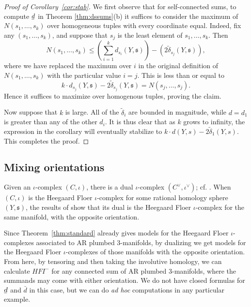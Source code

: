 \documentclass[11 pt]{amsart}
\theoremstyle{remark}
\def\s{\mathfrak s}
\newcommand{\bunderline}[1]{\underline{#1\mkern-2mu}\mkern2mu }
\def\du {\bar{d}}
\def\dl {\bunderline{d}}
\def\HFI {\mathit{HFI}}
\newcommand \HFIm {\HFI^-}
\def\inv{\iota}
\def\tdelta{\tilde\delta}
\begin{document}
\begin{proof}[Proof of Corollary~\ref{cor:stab}]
We first observe that for self-connected sums, to compute $\dl$ in Theorem \ref{thm:dssums}(b) it suffices to consider the maximum of $N(s_1, \ldots, s_k)$ over homogeneous tuples with every coordinate equal. Indeed, fix any $(s_1, \ldots, s_k)$, and suppose that $s_j$ is the least element of $s_1, \ldots, s_k$. Then
\[
N(s_1, \ldots, s_k) \leq \left( \sum_{i = 1}^k d_{s_i}(Y, \s) \right)- \left( 2\tdelta_{s_j}(Y, \s) \right),
\]
where we have replaced the maximum over $i$ in the original definition of $N(s_1, \ldots, s_k)$ with the particular value $i = j$. This is less than or equal to
\[
k \cdot d_{s_j}(Y, \s) - 2\tdelta_{s_j}(Y, \s) = N(s_j, \ldots, s_j).
\]
Hence it suffices to maximize over homogenous tuples, proving the claim. 

Now suppose that $k$ is large. All of the $\tdelta_i$ are bounded in magnitude, while $d = d_1$ is greater than any of the other $d_i$. It is thus clear that as $k$ grows to infinity, the expression in the corollary will eventually stabilize to $k \cdot d(Y, s) - 2\tdelta_1(Y, s)$. This completes the proof.
\end{proof}





\subsection{Mixing orientations}
Given an $\inv$-complex $(C, \inv)$, there is a dual $\inv$-complex $(C^\vee, \inv^\vee)$; cf. \cite[Section 8.3]{HMZ}. When $(C, \inv)$ is the Heegaard Floer $\inv$-complex for some rational homology sphere $(Y, \s)$,  the results of \cite[Section 4.2]{HMinvolutive} show that its dual is the Heegaard Floer $\inv$-complex for the same manifold, with the opposite orientation.

Since Theorem~\ref{thm:standard} already gives models for the Heegaard Floer $\inv$-complexes associated to AR plumbed $3$-manifolds, by dualizing we get models for the Heegaard Floer $\inv$-complexes of those manifolds with the opposite orientation. From here, by tensoring and then taking the involutive homology, we can calculate $\HFIm$ for any connected sum of AR plumbed $3$-manifolds, where the summands may come with either orientation. We do not have closed formulas for $\dl$ and $\du$ in this case, but we can do {\em ad hoc} computations in any particular example.
\end{document}

